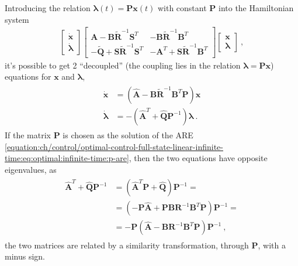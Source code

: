 \documentclass[letterpaper,10pt,english]{jupyterBook}
\begin{document}
\sphinxAtStartPar
Introducing the relation \(\boldsymbol\lambda(t) = \mathbf{P} \mathbf{x}(t)\) \sphinxhyphen{} with constant \(\mathbf{P}\) \sphinxhyphen{} into the Hamiltonian system
\begin{equation*}
\begin{split}
\begin{bmatrix} \dot{\mathbf{x}} \\ \dot{\boldsymbol\lambda} \end{bmatrix}
\begin{bmatrix}
  \mathbf{A} - \mathbf{B} \widetilde{\mathbf{R}}^{-1} \mathbf{S}^T & - \mathbf{B} \widetilde{\mathbf{R}}^{-1} \mathbf{B}^T \\
  -\widetilde{\mathbf{Q}} + \mathbf{S} \widetilde{\mathbf{R}}^{-1} \mathbf{S}^T & - \mathbf{A}^T + \mathbf{S} \widetilde{\mathbf{R}}^{-1} \mathbf{B}^T
\end{bmatrix}
\begin{bmatrix}      \mathbf{x}  \\      \boldsymbol\lambda  \end{bmatrix} \ ,
\end{split}
\end{equation*}
\sphinxAtStartPar
it’s possible to get 2 “decoupled” (the coupling lies in the relation \(\boldsymbol\lambda = \mathbf{P} \mathbf{x}\)) equations for \(\mathbf{x}\) and \(\boldsymbol\lambda\),
\begin{equation*}
\begin{split}\begin{aligned}
  \dot{\mathbf{x}} & = \left( \hat{\mathbf{A}} - \mathbf{B} \widetilde{\mathbf{R}}^{-1} \mathbf{B}^T \mathbf{P} \right) \mathbf{x} \\
  \dot{\boldsymbol{\lambda}} & = - \left( \hat{\mathbf{A}}^T + \hat{\mathbf{Q}} \mathbf{P}^{-1} \right) \boldsymbol\lambda \ . 
\end{aligned}\end{split}
\end{equation*}
\sphinxAtStartPar
If the matrix \(\mathbf{P}\) is chosen as the solution of the ARE \eqref{equation:ch/control/optimal-control-full-state-linear-infinite-time:eq:optimal:infinite-time:p-are}, then the two equations have opposite eigenvalues, as
\begin{equation*}
\begin{split}\begin{aligned}
  \hat{\mathbf{A}}^T + \hat{\mathbf{Q}} \mathbf{P}^{-1}
  & = \left( \hat{\mathbf{A}}^T \mathbf{P} + \hat{\mathbf{Q}} \right) \mathbf{P}^{-1} = \\
  & = \left( - \mathbf{P} \hat{\mathbf{A}} + \mathbf{P} \mathbf{B} \mathbf{R}^{-1} \mathbf{B}^T \mathbf{P} \right) \mathbf{P}^{-1} = \\
  & = - \mathbf{P} \left(  \hat{\mathbf{A}} - \mathbf{B} \mathbf{R}^{-1} \mathbf{B}^T \mathbf{P} \right) \mathbf{P}^{-1} \ ,
\end{aligned}\end{split}
\end{equation*}
\sphinxAtStartPar
the two matrices are related by a similarity transformation, through \(\mathbf{P}\), with a minus sign.
\end{document}
